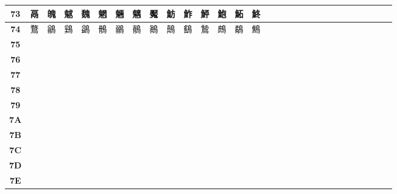 \begin{table}[H]
\begin{tabular}{|Sc|Sc|Sc|Sc|Sc|Sc|Sc|Sc|Sc|Sc|Sc|Sc|Sc|Sc|Sc|}
\textbf{73} & 鬲 & 魄 & 魃 & 魏 & 魍 & 魎 & 魑 & 魘 & 魴 & 鮓 & 鮃 & 鮑 & 鮖 & 鮗 \\ \hline
\textbf{74} & 鶩 & 鶲 & 鷄 & 鷁 & 鶻 & 鶸 & 鶺 & 鷆 & 鷏 & 鷂 & 鷙 & 鷓 & 鷸 & 鷦 \\ \hline
\textbf{75} &  &  &  &  &  &  &  &  &  &  &  &  &  &  \\ \hline
\textbf{76} &  &  &  &  &  &  &  &  &  &  &  &  &  &  \\ \hline
\textbf{77} &  &  &  &  &  &  &  &  &  &  &  &  &  &  \\ \hline
\textbf{78} &  &  &  &  &  &  &  &  &  &  &  &  &  &  \\ \hline
\textbf{79} &  &  &  &  &  &  &  &  &  &  &  &  &  &  \\ \hline
\textbf{7A} &  &  &  &  &  &  &  &  &  &  &  &  &  &  \\ \hline
\textbf{7B} &  &  &  &  &  &  &  &  &  &  &  &  &  &  \\ \hline
\textbf{7C} &  &  &  &  &  &  &  &  &  &  &  &  &  &  \\ \hline
\textbf{7D} &  &  &  &  &  &  &  &  &  &  &  &  &  &  \\ \hline
\textbf{7E} &  &  &  &  &  &  &  &  &  &  &  &  &  &  \\ \hline
\end{tabular}
\end{table}


